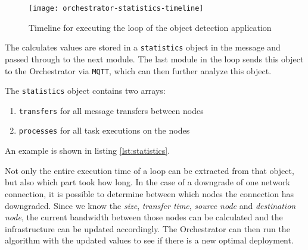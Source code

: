 \begin{figure}[h]
    \centering
    \texttt{[image: orchestrator-statistics-timeline]}
    \caption{Timeline for executing the loop of the object detection application}
    \label{fig:orchestrator-statistics-timeline}
\end{figure}

The calculates values are stored in a \texttt{statistics} object in the message and passed through to the next module. The last module in the loop sends this object to the Orchestrator via \texttt{MQTT}, which can then further analyze this object.

The \texttt{statistics} object contains two arrays:
\begin{enumerate}
    \item \texttt{transfers} for all message transfers between nodes
    \item \texttt{processes} for all task executions on the nodes
\end{enumerate}

An example is shown in listing \ref{lst:statistics}.



Not only the entire execution time of a loop can be extracted from that object, but also which part took how long. In the case of a downgrade of one network connection, it is possible to determine between which nodes the connection has downgraded. Since we know the \textit{size}, \textit{transfer time}, \textit{source node} and \textit{destination node}, the current bandwidth between those nodes can be calculated and the infrastructure can be updated accordingly. The Orchestrator can then run the algorithm with the updated values to see if there is a new optimal deployment.